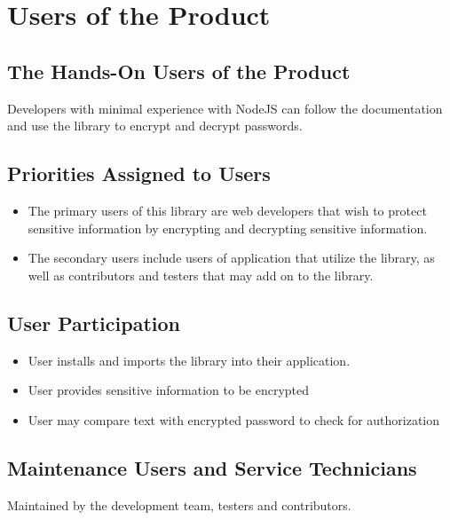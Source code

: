 \documentclass[12pt]{article}
\begin{document}
\section{Users of the Product}

\subsection{ The Hands-On Users of the Product}
Developers with minimal experience with NodeJS can follow the documentation and use the library to encrypt and decrypt passwords.

\subsection{Priorities Assigned to Users}

  \begin{itemize}
    \item The primary users of this library are web developers that wish to protect sensitive information by encrypting and decrypting sensitive information.

    \item The secondary users include users of application that utilize the library, as well as contributors and testers that may add on to the library.
  \end{itemize}

\subsection{User Participation}

  \begin{itemize}
    \item User installs and imports the library into their application.
    \item User provides sensitive information to be encrypted 
    \item User may compare text with encrypted password to check for authorization
  \end{itemize}


\subsection{Maintenance Users and Service Technicians}
Maintained by the development team, testers and contributors. \\ \\ \\
\end{document}
